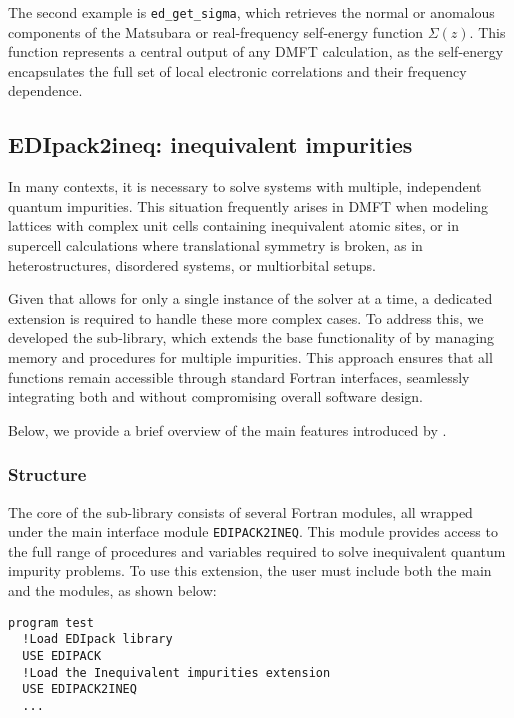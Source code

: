 \documentclass[edipack_sp.tex]{subfiles}
\begin{document}
The second example is \texttt{ed\_get\_sigma}, which retrieves the 
normal or anomalous components of the Matsubara or real-frequency 
self-energy function $\Sigma(z)$. This function represents a central 
output of any DMFT calculation, as the self-energy encapsulates the 
full set of local electronic correlations and their frequency 
dependence.







\subsection{EDIpack2ineq: inequivalent impurities}\label{sSecIneq}
In many contexts, it is necessary to solve systems with multiple, 
independent quantum impurities. This situation frequently arises in 
DMFT when modeling lattices with complex unit cells containing 
inequivalent atomic sites, or in supercell calculations where 
translational symmetry is broken, as in heterostructures, disordered 
systems, or multiorbital setups. 

Given that \NAME allows for only a single instance of the solver at a 
time, a dedicated extension is required to handle these more complex 
cases. To address this, we developed the  
sub-library, which extends the base functionality of \NAME by managing 
memory and procedures for multiple impurities. This approach ensures 
that all functions remain accessible through standard Fortran 
interfaces, seamlessly integrating both \NAME and  
without compromising overall software design.

Below, we provide a brief overview of the main features introduced by 
.

\subsubsection{Structure}\label{ssSecIneqStructure}
The core of the  sub-library consists of several 
Fortran modules, all wrapped under the main interface module 
{\tt EDIPACK2INEQ}. This module provides access to the full range of 
procedures and variables required to solve inequivalent quantum 
impurity problems. To use this extension, the user must include both 
the main \NAME and the  modules, as shown below:
\begin{lstlisting}[style=fstyle,numbers=none,basicstyle={\scriptsize\ttfamily}]
program test
  !Load EDIpack library 
  USE EDIPACK
  !Load the Inequivalent impurities extension
  USE EDIPACK2INEQ
  ...
\end{lstlisting}
\end{document}
